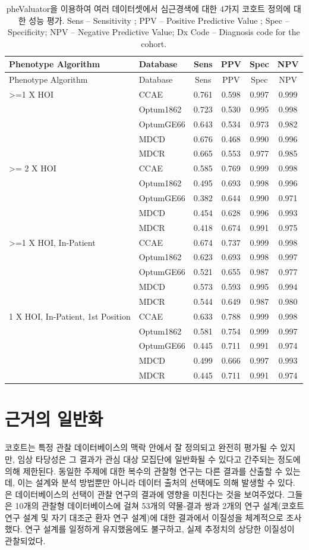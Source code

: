 \documentclass[10.5pt]{book}
\theoremstyle{definition}
\theoremstyle{definition}
\theoremstyle{definition}
\theoremstyle{remark}
\begin{document}
\begin{longtable}[]{@{}llcccc@{}}
\caption{\label{tab:phevalStats} pheValuator을 이용하여 여러 데이터셋에서
심근경색에 대한 4가지 코호트 정의에 대한 성능 평가. Sens -- Sensitivity
; PPV -- Positive Predictive Value ; Spec -- Specificity; NPV --
Negative Predictive Value; Dx Code -- Diagnosis code for the
cohort.}\tabularnewline
\toprule
Phenotype Algorithm & Database & Sens & PPV & Spec & NPV\tabularnewline
\midrule
\endfirsthead
\toprule
Phenotype Algorithm & Database & Sens & PPV & Spec & NPV\tabularnewline
\midrule
\endhead
\textgreater{}=1 X HOI & CCAE & 0.761 & 0.598 & 0.997 &
0.999\tabularnewline
& Optum1862 & 0.723 & 0.530 & 0.995 & 0.998\tabularnewline
& OptumGE66 & 0.643 & 0.534 & 0.973 & 0.982\tabularnewline
& MDCD & 0.676 & 0.468 & 0.990 & 0.996\tabularnewline
& MDCR & 0.665 & 0.553 & 0.977 & 0.985\tabularnewline
\textgreater{}= 2 X HOI & CCAE & 0.585 & 0.769 & 0.999 &
0.998\tabularnewline
& Optum1862 & 0.495 & 0.693 & 0.998 & 0.996\tabularnewline
& OptumGE66 & 0.382 & 0.644 & 0.990 & 0.971\tabularnewline
& MDCD & 0.454 & 0.628 & 0.996 & 0.993\tabularnewline
& MDCR & 0.418 & 0.674 & 0.991 & 0.975\tabularnewline
\textgreater{}=1 X HOI, In-Patient & CCAE & 0.674 & 0.737 & 0.999 &
0.998\tabularnewline
& Optum1862 & 0.623 & 0.693 & 0.998 & 0.997\tabularnewline
& OptumGE66 & 0.521 & 0.655 & 0.987 & 0.977\tabularnewline
& MDCD & 0.573 & 0.593 & 0.995 & 0.994\tabularnewline
& MDCR & 0.544 & 0.649 & 0.987 & 0.980\tabularnewline
1 X HOI, In-Patient, 1st Position & CCAE & 0.633 & 0.788 & 0.999 &
0.998\tabularnewline
& Optum1862 & 0.581 & 0.754 & 0.999 & 0.997\tabularnewline
& OptumGE66 & 0.445 & 0.711 & 0.991 & 0.974\tabularnewline
& MDCD & 0.499 & 0.666 & 0.997 & 0.993\tabularnewline
& MDCR & 0.445 & 0.711 & 0.991 & 0.974\tabularnewline
\bottomrule
\end{longtable}

\section{근거의 일반화}\label{GeneralizabilityOfEvidence}

코호트는 특정 관찰 데이터베이스의 맥락 안에서 잘 정의되고 완전히 평가될
수 있지만, 임상 타당성은 그 결과가 관심 대상 모집단에 일반화될 수 있다고
간주되는 정도에 의해 제한된다. 동일한 주제에 대한 복수의 관찰형 연구는
다른 결과를 산출할 수 있는데, 이는 설계와 분석 방법뿐만 아니라 데이터
출처의 선택에도 의해 발생할 수 있다. \citet{madigan_2013} 은
데이터베이스의 선택이 관찰 연구의 결과에 영향을 미친다는 것을
보여주었다. 그들은 10개의 관찰형 데이터베이스에 걸쳐 53개의 약물-결과
쌍과 2개의 연구 설계(코호트 연구 설계 및 자기 대조군 환자 연구 설계)에
대한 결과에서 이질성을 체계적으로 조사했다. 연구 설계를 일정하게
유지했음에도 불구하고, 실제 추정치의 상당한 이질성이 관찰되었다.
\end{document}
